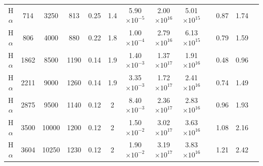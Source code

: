 \documentclass[useAMS,usenatbib,usegraphicx]{mnras}
\begin{document}
\begin{table}
\begin{minipage}{180mm}
\begin{center}
\begin{tabular}{@{} ccccccccccccc @{}}
H$\alpha$ & 714 & 3250 & 813&0.25 & 1.4 & 5.90$\times 10^{-5}$ &   2.00$\times 10^{16}$ & 5.01$\times 10^{15}$ & & 0.87 & 1.74 \\
H$\alpha$ & 806 & 4000 & 880&0.22 & 1.8 & 1.00$\times 10^{-4}$ &   2.79$\times 10^{16}$ & 6.13$\times 10^{15}$ & & 0.79 & 1.59\\
H$\alpha$ & 1862 & 8500 & 1190&0.14 & 1.9 & 1.40$\times 10^{-3}$ &   1.37$\times 10^{17}$ & 1.91$\times 10^{16}$ & & 0.48 & 0.96 \\

H$\alpha$ & 2211 & 9000 & 1260&0.14 & 1.9 & 3.35$\times 10^{-3}$ &   1.72$\times 10^{17}$ & 2.41$\times 10^{16}$ & & 0.74 & 1.49\\

H$\alpha$ & 2875 & 9500 & 1140&0.12 & 2 & 8.40$\times 10^{-3}$ &   2.36$\times 10^{17}$ & 2.83$\times 10^{16}$ & & 0.96 & 1.93 \\

H$\alpha$ & 3500 & 10000 & 1200&0.12 & 2 & 1.50$\times 10^{-2}$  & 3.02$\times 10^{17}$ & 3.63$\times 10^{16}$ && 1.08 & 2.16  \\

H$\alpha$ & 3604 & 10250 & 1230&0.12 & 2 & 1.90$\times 10^{-2}$ &   3.19$\times 10^{17}$ & 3.83$\times 10^{16}$ & & 1.21 & 2.42 \\ 

    \hline
  \end{tabular}
  \end{center}
\end{minipage}
\end{table}
\end{document}
